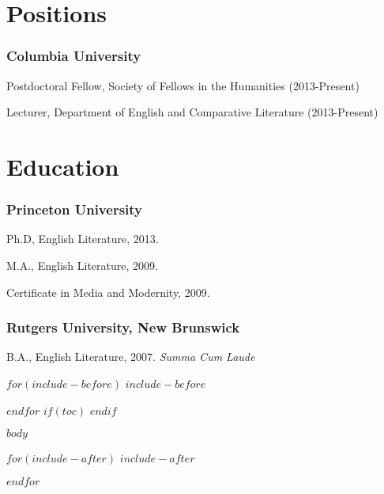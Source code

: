 \documentclass[11pt]{article}
\begin{document}
\bigskip\bigskip\medskip
{}
\reversemarginpar
\bigskip 

\section*{Positions}

\subsubsection{Columbia University}

Postdoctoral Fellow, Society of Fellows in the Humanities (2013-Present)

\smallskip

Lecturer, Department of English and Comparative Literature (2013-Present)

\medskip

\section*{Education}

\subsubsection{Princeton University}

Ph.D, English Literature, 2013.
 
\smallskip

M.A., English Literature, 2009.

\smallskip

Certificate in Media and Modernity, 2009. %

\medskip

\subsubsection{Rutgers University, New Brunswick}

B.A., English Literature, 2007. \emph{Summa Cum Laude} %

\medskip

$for(include-before)$
$include-before$

$endfor$
$if(toc)$
\tableofcontents
$endif$

$body$

$for(include-after)$
$include-after$

$endfor$
\end{document}
